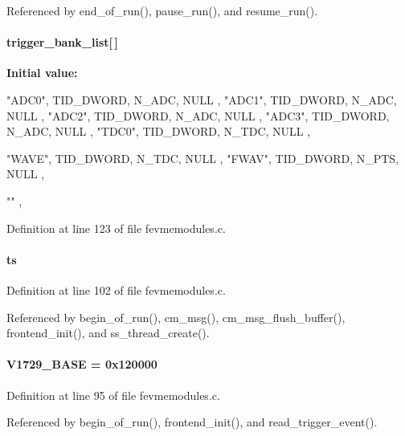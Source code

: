 Referenced by end\_\-of\_\-run(), pause\_\-run(), and resume\_\-run().
\paragraph[{trigger\_\-bank\_\-list}]{ {\bf trigger\_\-bank\_\-list}\mbox{[}$\,$\mbox{]}}\hfill\label{fevmemodules_8c_a578a99806dff3ee5cd0c3c6583e60db4}
{\bfseries Initial value:}
\begin{DoxyCode}
 {

   
   {"ADC0", TID_DWORD, N_ADC, NULL}
   ,
   {"ADC1", TID_DWORD, N_ADC, NULL}
   ,
   {"ADC2", TID_DWORD, N_ADC, NULL}
   ,
   {"ADC3", TID_DWORD, N_ADC, NULL}
   ,
   {"TDC0", TID_DWORD, N_TDC, NULL}
   ,

   {"WAVE", TID_DWORD, N_TDC, NULL}
   ,
   {"FWAV", TID_DWORD, N_PTS, NULL}
   ,

   {""}
   ,
}
\end{DoxyCode}


Definition at line 123 of file fevmemodules.c.
\paragraph[{ts}]{ {\bf ts}}\hfill\label{fevmemodules_8c_a8d1988d3d35f995fe7cb2e1095e59136}


Definition at line 102 of file fevmemodules.c.

Referenced by begin\_\-of\_\-run(), cm\_\-msg(), cm\_\-msg\_\-flush\_\-buffer(), frontend\_\-init(), and ss\_\-thread\_\-create().
\paragraph[{V1729\_\-BASE}]{ {\bf V1729\_\-BASE} = 0x120000}\hfill\label{fevmemodules_8c_aaea9e4342e75a4567348965a0aad8fc7}


Definition at line 95 of file fevmemodules.c.

Referenced by begin\_\-of\_\-run(), frontend\_\-init(), and read\_\-trigger\_\-event().
